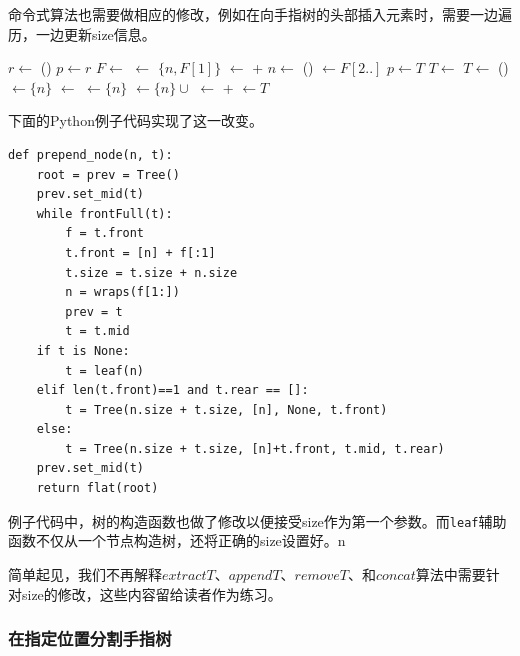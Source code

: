 \documentclass[b5paper]{ctexart}
\begin{document}
命令式算法也需要做相应的修改，例如在向手指树的头部插入元素时，需要一边遍历，一边更新size信息。

\begin{algorithmic}
  \State $r \gets $ ()
  \State $p \gets r$
  \State {}
    \State $F \gets $ 
    \State {} $\gets$ $\{n, F[1]\}$
    \State {} $\gets$  +  
    \State $n \gets$ ()
    \State {} $\gets F[2..]$
    \State $p \gets T$
    \State $T \gets$ 
  \EndWhile
    \State $T \gets$ ()
    \State {}$\gets \{ n \}$
    \State {} $\gets$ 
    \State {} $\gets \{ n \}$
  \Else
    \State {} $\gets \{ n \} \cup $ 
  \EndIf
  \State {} $\gets$  +  
  \State {} $\gets T$
  \State \Return {}
\EndFunction
\end{algorithmic}

下面的Python例子代码实现了这一改变。

\lstset{language=Python}
\begin{lstlisting}
def prepend_node(n, t):
    root = prev = Tree()
    prev.set_mid(t)
    while frontFull(t):
        f = t.front
        t.front = [n] + f[:1]
        t.size = t.size + n.size
        n = wraps(f[1:])
        prev = t
        t = t.mid
    if t is None:
        t = leaf(n)
    elif len(t.front)==1 and t.rear == []:
        t = Tree(n.size + t.size, [n], None, t.front)
    else:
        t = Tree(n.size + t.size, [n]+t.front, t.mid, t.rear)
    prev.set_mid(t)
    return flat(root)
\end{lstlisting}

例子代码中，树的构造函数也做了修改以便接受size作为第一个参数。而\texttt{leaf}辅助函数不仅从一个节点构造树，还将正确的size设置好。n

简单起见，我们不再解释$extractT$、$appendT$、$removeT$、和$concat$算法中需要针对size的修改，这些内容留给读者作为练习。

\subsubsection{在指定位置分割手指树}
\end{document}
